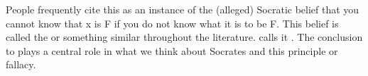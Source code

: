 \documentclass[11pt]{article}
\begin{document}
People frequently cite this as an instance of the (alleged) Socratic belief
that you cannot know that x is F if you do not know what it is to be F.  This
belief is called the  or something similar
throughout the literature.  \citet{geach1966} calls it .  The conclusion to  plays a central role in what we think
about Socrates and this principle or fallacy.



\newpage


\end{document}
